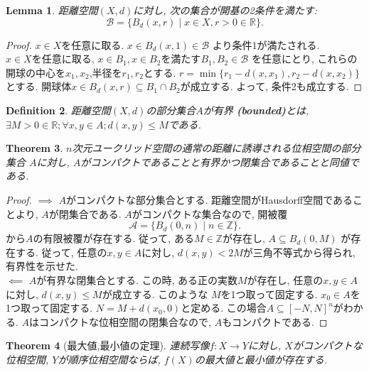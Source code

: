 \documentclass[dvipdfmx]{jbook}
\newtheorem{theorem}{Theorem}[section]
\newtheorem{lemma}[theorem]{Lemma}
\newtheorem{definition}[theorem]{Definition}
\theoremstyle{remark}
\theoremstyle{plain}
\begin{document}
\begin{lemma}
	距離空間$(X,d)$に対し, 次の集合が開基の2条件を満たす:
	 \[
	 \mathcal{B} = \{ B_d(x,r)  \mid  x \in X, r >0 \in \mathbb{R}\} 
	 .\] 
\end{lemma}

\begin{proof}
	$x \in X$を任意に取る.  $x \in B_d(x,1) \in \mathcal{B}$ より条件1が満たされる.\\
	$x \in X$を任意に取る,  $x \in B_1, x \in B_2$を満たす$B_1,B_2 \in \mathcal{B}$ を任意にとり, これらの開球の中心を$x_1,x_2$,半径を$r_1,r_2$とする. $r = \min \{ r_1 - d(x,x_1), r_2 -d(x,x_2)\} $ とする. 開球体$ x \in B_d(x,r) \subseteq  B_1 \cap B_2$が成立する. よって, 条件2も成立する.
\end{proof}

\begin{definition}
	距離空間$\left( X, d \right) $の部分集合$A$が有界 \textbf{(bounded)}とは,  $\exists M>0 \in \mathbb{R}; \forall x, y \in A; d(x,y) \le M$である.
\end{definition}

\begin{theorem}
	$n$次元ユークリッド空間の通常の距離に誘導される位相空間の部分集合 $A$に対し,  $A$がコンパクトであることと有界かつ閉集合であることと同値である.
\end{theorem}

\begin{proof}
	$\implies$ $A$がコンパクトな部分集合とする. 距離空間がHausdorff空間であることより,  $A$が閉集合である.   $A$がコンパクトな集合なので, 開被覆
	 \[
	 \mathcal{A}= \{ B_d \left( 0, n \right)  \mid  n \in \mathbb{Z}\} 
	 .\]
	 から$A$の有限被覆が存在する. 従って, ある$M \in \mathbb{Z}$が存在し, $A \subseteq  B_d\left( 0,M \right) $ が存在する. 従って, 任意の$x,y \in A$に対し,  $d(x,y) < 2M$が三角不等式から得られ, 有界性を示せた.\\
	 $\impliedby$ $A$が有界な閉集合とする. この時, ある正の実数$M$が存在し,  任意の$x, y \in A$に対し,  $d(x,y) \le M$が成立する. このような $M$を1つ取って固定する. $x_0 \in A$を1つ取って固定する.
	 $N = M + d(x_0, 0)$と定める. この場合$A \subseteq [-N, N]^n$がわかる. 
	 $A$はコンパクトな位相空間の閉集合なので,  $A$もコンパクトである.
\end{proof}

\begin{theorem}[最大値,最小値の定理]
	連続写像$f : X \to Y$に対し, $X$がコンパクトな位相空間,  $Y$が順序位相空間ならば,  $f(X)$の最大値と最小値が存在する.
\end{theorem}
\end{document}
